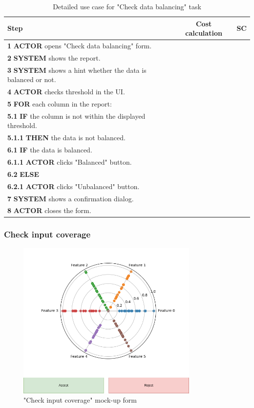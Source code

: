 \begin{table}[H]
\centering
\begin{tabular}{|l|c|c|}
\hline
\textbf{Step} & \textbf{Cost calculation} & \textbf{SC} \\
\hline
\textbf{1} \textbf{ACTOR} opens "Check data balancing" form. & & \\
\hline
\textbf{2} \textbf{SYSTEM} shows the report. & & \\
\hline
\textbf{3} \textbf{SYSTEM} shows a hint whether the data is balanced or not. & & \\
\hline
\textbf{4} \textbf{ACTOR} checks threshold in the UI. & & \\
\hline
\textbf{5} \textbf{FOR} each column in the report: & & \\
\hline
\textbf{5.1} \textbf{IF} the column is not within the displayed threshold. & & \\
\hline
\textbf{5.1.1} \textbf{THEN} the data is not balanced. & & \\
\hline
\textbf{6.1} \textbf{IF} the data is balanced. & & \\
\hline
\textbf{6.1.1} \textbf{ACTOR} clicks "Balanced" button. & & \\
\hline
\textbf{6.2} \textbf{ELSE} & & \\
\hline
\textbf{6.2.1} \textbf{ACTOR} clicks "Unbalanced" button. & & \\
\hline
\textbf{7} \textbf{SYSTEM} shows a confirmation dialog. & & \\
\hline
\textbf{8} \textbf{ACTOR} closes the form. & & \\
\hline
\end{tabular}
\caption{Detailed use case for "Check data balancing" task}
\label{table:check_data_balancing}
\end{table}

\subsubsection{Check input coverage}

\begin{figure}[H]
\centering
\includegraphics[width=0.8\textwidth]{figures/check_input_coverage.png}
\caption{"Check input coverage" mock-up form}
\end{figure}

